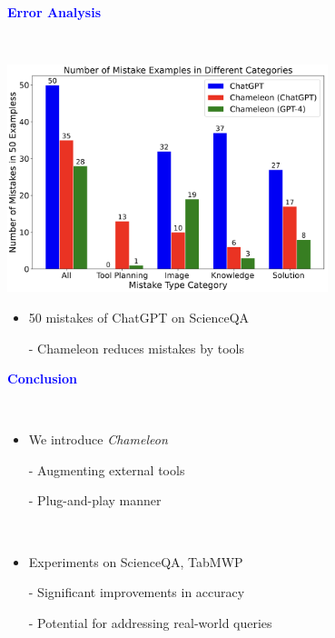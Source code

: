 \documentclass[professionalfont]{beamer}
\begin{document}
\begin{frame}

\begin{center}
    { \textbf{\textcolor{blue}{ {\fontsize{12}{14}\selectfont Error Analysis} }} }
\end{center}
\\[0.3cm]

\begin{center}
    \includegraphics[width=0.7\textwidth]{figure/6.png}
\end{center}


{\fontsize{10}{14}\selectfont 
\begin{itemize}
    \item 50 mistakes of ChatGPT on ScienceQA
    
    - Chameleon reduces mistakes by tools
\end{itemize}
}

\end{frame}

\begin{frame}

\begin{center}
    { \textbf{\textcolor{blue}{ {\fontsize{12}{14}\selectfont Conclusion} }} }
\end{center}
\\[0.3cm]

{\fontsize{10}{14}\selectfont 
\begin{itemize}
    \item We introduce \textit{Chameleon}

    - Augmenting external tools

    - Plug-and-play manner

    \\[0.5cm]

    \item Experiments on ScienceQA, TabMWP

    - Significant improvements in accuracy

    - Potential for addressing real-world queries
\end{itemize}
}

\end{frame}
\end{document}
